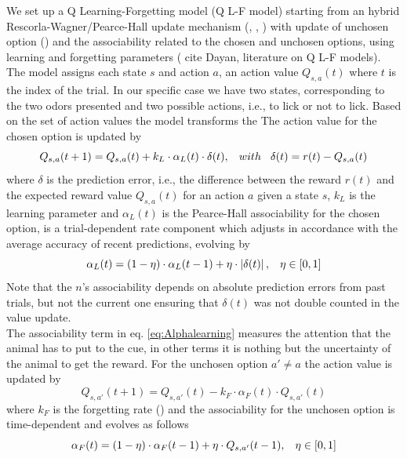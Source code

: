 We set up a Q Learning-Forgetting model (Q L-F model) starting from an hybrid Rescorla-Wagner/Pearce-Hall update mechanism (\cite{Koppe}, \cite{Costa}, \cite{Li}) with update of unchosen option (\cite{Katahira}) and the associability related to the chosen and unchosen options, using learning and forgetting parameters ({\color{red} cite Dayan, literature on Q L-F models}).
The model assigns each state $s$ and action $a$, an action value $Q_{s,a}(t)$ where $t$ is the index of the trial. In our specific case we have two states, corresponding to the two odors presented and two possible actions, i.e., to lick or not to lick. 
Based on the set of action values the model transforms the The action value for the chosen option is updated by
\begin{equation}
Q_{s,a}(t+1)  = Q_{s,a}(t)+k_L\cdot\alpha_L(t)\cdot\delta(t), \hspace{0.3cm} with \hspace{0.3cm}\delta(t)=r(t)-Q_{s,a}(t)
\label{eq:Qlearning}
\end{equation}
where $\delta$ is the prediction error, i.e., the difference between the reward $r(t)$ and the expected reward value $Q_{s,a}(t)$ for an action $a$ given a state $s$, $k_L$ is the learning parameter and $\alpha_L(t)$ is the Pearce-Hall associability for the chosen option, is a trial-dependent rate component which adjusts in accordance with the average accuracy of recent predictions, evolving by
\begin{equation}
   \alpha_L(t)=(1-\eta)\cdot\alpha_L(t-1)+\eta\cdot\left\lvert\delta(t)\right\rvert,\hspace{0.3cm} \eta\in[0,1]
    \label{eq:Alphalearning}
\end{equation}
Note that the $n$'s associability depends on absolute prediction errors from past trials, but not the current one ensuring that $\delta(t)$ was not double counted in the value update.\\The associability term in eq. \ref{eq:Alphalearning} measures the attention that the animal has to put to the cue, in other terms it is nothing but the uncertainty of the animal to get the reward. 
For the unchosen option $a'\neq a$ the action value is updated by
\begin{equation}
    Q_{s,a'}(t+1) = Q_{s,a'}(t)-k_F\cdot\alpha_F(t)\cdot Q_{s,a'}(t)
    \label{eq:Qforgetting}
\end{equation}
where $k_F$ is the forgetting rate (\cite{ItoDoya}) and the associability for the unchosen option is time-dependent and evolves as follows
\begin{equation}
    \alpha_F(t)=(1-\eta)\cdot\alpha_F(t-1)+\eta\cdot Q_{s,a'}(t-1), \hspace{0.3cm}
    \eta\in[0,1]
    \label{eq:Alphaforgetting}
\end{equation}
